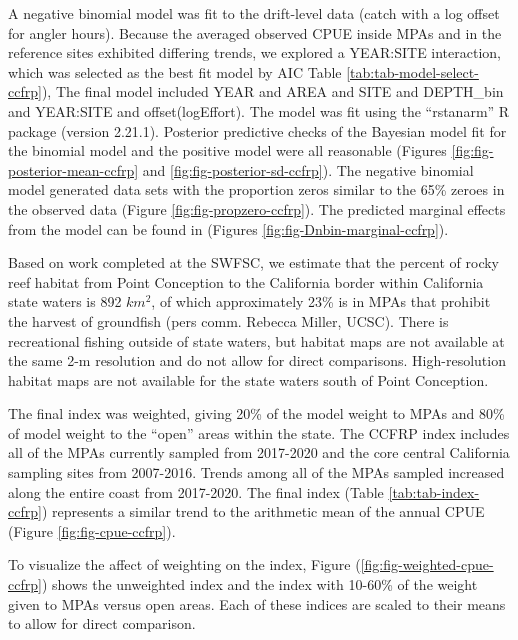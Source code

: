 \documentclass[11pt,
  english,
]{article}
\begin{document}
A negative binomial model was fit to the drift-level data (catch with a log offset for angler hours). Because the averaged observed CPUE inside MPAs and in the reference sites exhibited differing trends, we explored a YEAR:SITE interaction, which was selected as the best fit model by AIC Table \ref{tab:tab-model-select-ccfrp}), The final model included YEAR and AREA and SITE and DEPTH\_bin and YEAR:SITE and offset(logEffort). The model was fit using the ``rstanarm'' R package (version 2.21.1). Posterior predictive checks of the Bayesian model fit for the binomial model and the positive model were all reasonable (Figures \ref{fig:fig-posterior-mean-ccfrp} and \ref{fig:fig-posterior-sd-ccfrp}). The negative binomial model generated data sets with the proportion zeros similar to the 65\% zeroes in the observed data (Figure \ref{fig:fig-propzero-ccfrp}). The predicted marginal effects from the model can be found in (Figures \ref{fig:fig-Dnbin-marginal-ccfrp}).

Based on work completed at the SWFSC, we estimate that the percent of rocky reef habitat from Point Conception to the California border within California state waters is 892 {\(km^2\)\leavevmode\tagmcend\tagstructend}, of which approximately 23\% is in MPAs that prohibit the harvest of groundfish (pers comm. Rebecca Miller, UCSC). There is recreational fishing outside of state waters, but habitat maps are not available at the same 2-m resolution and do not allow for direct comparisons. High-resolution habitat maps are not available for the state waters south of Point Conception.

The final index was weighted, giving 20\% of the model weight to MPAs and 80\% of model weight to the ``open'' areas within the state. The CCFRP index includes all of the MPAs currently sampled from 2017-2020 and the core central California sampling sites from 2007-2016. Trends among all of the MPAs sampled increased along the entire coast from 2017-2020. The final index (Table \ref{tab:tab-index-ccfrp}) represents a similar trend to the arithmetic mean of the annual CPUE (Figure \ref{fig:fig-cpue-ccfrp}).

To visualize the affect of weighting on the index, Figure (\ref{fig:fig-weighted-cpue-ccfrp}) shows the unweighted index and the index with 10-60\% of the weight given to MPAs versus open areas. Each of these indices are scaled to their means to allow for direct comparison.

\newpage
\end{document}
